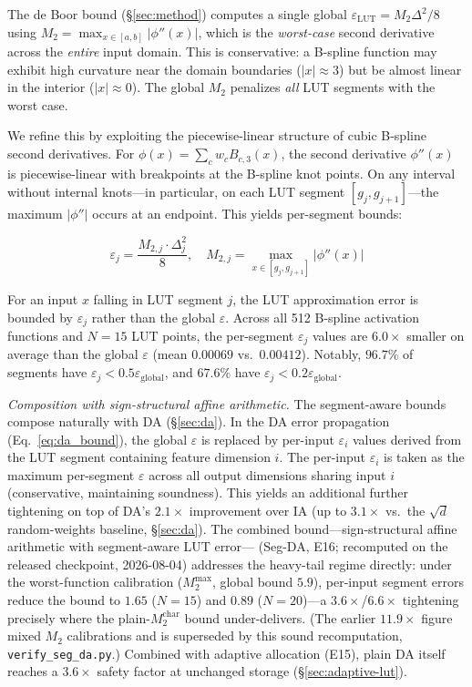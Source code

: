 \documentclass[journal,onecolumn]{IEEEtran}
\begin{document}
The de Boor bound ({\S}\ref{sec:method}) computes a single global
$\varepsilon_{\text{LUT}} = M_2\Delta^2/8$ using
$M_2 = \max_{x\in[a,b]}|\phi''(x)|$, which is the \textit{worst-case}
second derivative across the \textit{entire} input domain. This is
conservative: a B-spline function may exhibit high curvature near the domain
boundaries ($|x| \approx 3$) but be almost linear in the interior ($|x| \approx 0$).
The global $M_2$ penalizes \textit{all} LUT segments with the worst case.

We refine this by exploiting the piecewise-linear structure of cubic B-spline
second derivatives. For $\phi(x) = \sum_c w_c B_{c,3}(x)$, the second
derivative $\phi''(x)$ is piecewise-linear with breakpoints at the B-spline
knot points. On any interval without internal knots---in particular, on each
LUT segment $[g_j, g_{j+1}]$---the maximum $|\phi''|$ occurs at an endpoint.
This yields per-segment bounds:

\begin{equation}
\varepsilon_j = \frac{M_{2,j} \cdot \Delta_j^2}{8},\quad
M_{2,j} = \max_{x\in[g_j,g_{j+1}]}|\phi''(x)|
\label{eq:segment_bound}
\end{equation}

For an input $x$ falling in LUT segment $j$, the LUT approximation error is
bounded by $\varepsilon_j$ rather than the global $\varepsilon$. Across all
512 B-spline activation functions and $N=15$ LUT points, the per-segment
$\varepsilon_j$ values are $6.0\times$ smaller on average than the global
$\varepsilon$ (mean $0.00069$ vs.\ $0.00412$). Notably, $96.7\%$ of
segments have $\varepsilon_j < 0.5\varepsilon_{\text{global}}$, and
$67.6\%$ have $\varepsilon_j < 0.2\varepsilon_{\text{global}}$.

\textit{Composition with sign-structural affine arithmetic.} The segment-aware bounds
compose naturally with DA ({\S}\ref{sec:da}). In the DA error propagation
(Eq.~\ref{eq:da_bound}), the global $\varepsilon$ is replaced by per-input
$\varepsilon_i$ values derived from the LUT segment containing feature
dimension $i$. The per-input $\varepsilon_i$ is taken as the maximum
per-segment $\varepsilon$ across all output dimensions sharing input $i$
(conservative, maintaining soundness). This yields an additional
further tightening on top of DA's $2.1\times$ improvement over IA
(up to $3.1\times$ vs.\ the $\sqrt{d}$ random-weights baseline, {\S}\ref{sec:da}).
The combined bound---sign-structural affine arithmetic with segment-aware LUT error---
(Seg-DA, E16; recomputed on the released checkpoint, 2026-08-04) addresses
the heavy-tail regime directly: under the worst-function calibration
($M_2^{\max}$, global bound $5.9$), per-input segment errors reduce the
bound to $1.65$ ($N{=}15$) and $0.89$ ($N{=}20$)---a
$3.6\times$/$6.6\times$ tightening precisely where the
plain-$M_2^{\text{char}}$ bound under-delivers. (The earlier
$11.9\times$ figure mixed $M_2$ calibrations and is superseded by this
sound recomputation, \texttt{verify\_seg\_da.py}.) Combined with adaptive
allocation (E15), plain DA itself reaches a $3.6\times$ safety factor at
unchanged storage ({\S}\ref{sec:adaptive-lut}).
\end{document}
